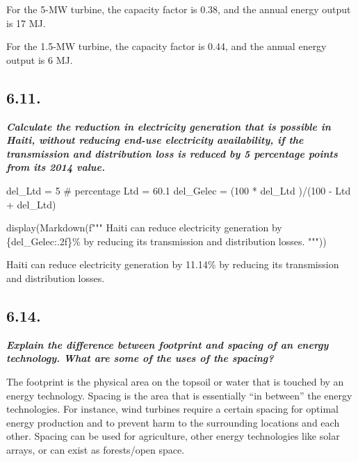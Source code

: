 \documentclass[
  letterpaper,
  DIV=11,
  numbers=noendperiod]{scrartcl}
\newenvironment{Shaded}{\begin{snugshade}}{\end{snugshade}}
\newcommand{\CommentTok}[1]{\textcolor[rgb]{0.37,0.37,0.37}{#1}}
\newcommand{\DecValTok}[1]{\textcolor[rgb]{0.68,0.00,0.00}{#1}}
\newcommand{\FloatTok}[1]{\textcolor[rgb]{0.68,0.00,0.00}{#1}}
\newcommand{\NormalTok}[1]{\textcolor[rgb]{0.00,0.23,0.31}{#1}}
\newcommand{\OperatorTok}[1]{\textcolor[rgb]{0.37,0.37,0.37}{#1}}
\newcommand{\SpecialCharTok}[1]{\textcolor[rgb]{0.37,0.37,0.37}{#1}}
\newcommand{\SpecialStringTok}[1]{\textcolor[rgb]{0.13,0.47,0.30}{#1}}
\begin{document}
For the 5-MW turbine, the capacity factor is 0.38, and the annual energy
output is 17 MJ.

For the 1.5-MW turbine, the capacity factor is 0.44, and the annual
energy output is 6 MJ.

\hypertarget{section-4}{%
\subsection{6.11.}\label{section-4}}

\textbf{\emph{Calculate the reduction in electricity generation that is
possible in Haiti, without reducing end-use electricity availability, if
the transmission and distribution loss is reduced by 5 percentage points
from its 2014 value.}}

\begin{Shaded}
\begin{Highlighting}[]
\NormalTok{del\_Ltd }\OperatorTok{=} \DecValTok{5} \CommentTok{\# percentage }
\NormalTok{Ltd }\OperatorTok{=} \FloatTok{60.1}
\NormalTok{del\_Gelec }\OperatorTok{=}\NormalTok{ (}\DecValTok{100} \OperatorTok{*}\NormalTok{ del\_Ltd )}\OperatorTok{/}\NormalTok{(}\DecValTok{100} \OperatorTok{{-}}\NormalTok{ Ltd }\OperatorTok{+}\NormalTok{ del\_Ltd)}

\NormalTok{display(Markdown(}\SpecialStringTok{f"""}
\SpecialStringTok{Haiti can reduce electricity generation by }\SpecialCharTok{\{}\NormalTok{del\_Gelec}\SpecialCharTok{:.2f\}}\SpecialStringTok{\%  by reducing its transmission and distribution losses.}
\SpecialStringTok{"""}\NormalTok{))}
\end{Highlighting}
\end{Shaded}

Haiti can reduce electricity generation by 11.14\% by reducing its
transmission and distribution losses.

\hypertarget{section-5}{%
\subsection{6.14.}\label{section-5}}

\textbf{\emph{Explain the difference between footprint and spacing of an
energy technology. What are some of the uses of the spacing?}}

The footprint is the physical area on the topsoil or water that is
touched by an energy technology. Spacing is the area that is essentially
``in between'' the energy technologies. For instance, wind turbines
require a certain spacing for optimal energy production and to prevent
harm to the surrounding locations and each other. Spacing can be used
for agriculture, other energy technologies like solar arrays, or can
exist as forests/open space.
\end{document}

